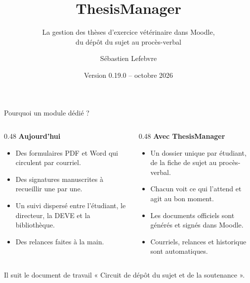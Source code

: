 \documentclass[aspectratio=169,11pt]{beamer}
\title{ThesisManager}
\subtitle{La gestion des thèses d'exercice vétérinaire dans Moodle,\\du dépôt du sujet au procès-verbal}
\author{Sébastien Lefebvre}
\date{Version 0.19.0 -- octobre 2026}
\begin{document}
\begin{frame}[plain]
  \titlepage
\end{frame}

\begin{frame}{Pourquoi un module dédié ?}
  \begin{columns}[T]
    \begin{column}{0.48\textwidth}
      \textbf{Aujourd'hui}
      \begin{itemize}
        \item Des formulaires PDF et Word qui circulent par courriel.
        \item Des signatures manuscrites à recueillir une par une.
        \item Un suivi dispersé entre l'étudiant, le directeur, la DEVE et la bibliothèque.
        \item Des relances faites à la main.
      \end{itemize}
    \end{column}
    \begin{column}{0.48\textwidth}
      \textbf{Avec ThesisManager}
      \begin{itemize}
        \item Un \alert{dossier unique} par étudiant, de la fiche de sujet au procès-verbal.
        \item Chacun voit ce qui l'attend et agit au bon moment.
        \item Les documents officiels sont \alert{générés et signés} dans Moodle.
        \item Courriels, relances et historique sont automatiques.
      \end{itemize}
    \end{column}
  \end{columns}
  \vfill
  \begin{center}
    \small\color{gris}Il suit le document de travail « Circuit de dépôt du sujet et de la soutenance ».
  \end{center}
\end{frame}
\end{document}
